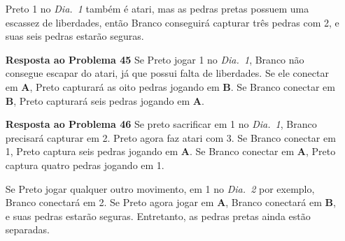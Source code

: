 \begin{itemize}
        Preto 1 no \emph{Dia.\@~1} também é atari, mas as pedras pretas possuem uma escassez de liberdades, então Branco conseguirá capturar três pedras com 2, e suas seis pedras estarão seguras.
    \item[\textbf{Resposta ao Problema 45}] Se Preto jogar 1 no \emph{Dia.\@~1}, Branco não consegue escapar do atari, já que possui falta de liberdades. Se ele conectar em \textbf{A}, Preto capturará as oito pedras jogando em \textbf{B}. Se Branco conectar em \textbf{B}, Preto capturará seis pedras jogando em \textbf{A}.
    \item[\textbf{Resposta ao Problema 46}] Se preto sacrificar em 1 no \emph{Dia.\@~1}, Branco precisará capturar em 2. Preto agora faz atari com 3. Se Branco conectar em 1, Preto captura seis pedras jogando em \textbf{A}. Se Branco conectar em \textbf{A}, Preto captura quatro pedras jogando em 1.
    
        Se Preto jogar qualquer outro movimento, em 1 no \emph{Dia.\@~2} por exemplo, Branco conectará em 2. Se Preto agora jogar em \textbf{A}, Branco conectará em \textbf{B}, e suas pedras estarão seguras. Entretanto, as pedras pretas ainda estão separadas.
\end{itemize}